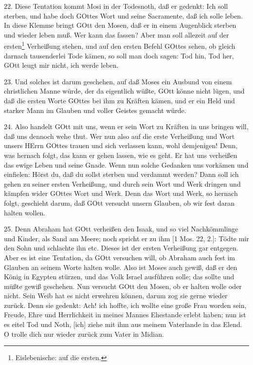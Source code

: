 22. Diese Tentation kommt Mosi in der Todesnoth, daß er gedenkt: Ich soll sterben, und habe doch GOttes Wort und seine Sacramente, daß ich solle leben. In diese Klemme bringt GOtt den Mosen, daß er in einem Augenblick sterben und wieder leben muß. Wer kann das fassen? Aber man soll allezeit auf der ersten\footnote{Eislebenische: auf die ersten.} Verheißung stehen, und auf den ersten Befehl GOttes sehen, ob gleich darnach tausenderlei Tode kämen, so soll man doch sagen: Tod hin, Tod her, GOtt leugt mir nicht, ich werde leben.

23. Und solches ist darum geschehen, auf daß Moses ein Ausbund von einem christlichen Manne würde, der da eigentlich wüßte, GOtt könne nicht lügen, und daß die ersten Worte GOttes bei ihm zu Kräften kämen, und er ein Held und starker Mann im Glauben und voller Geistes gemacht würde.

24. Also handelt GOtt mit uns, wenn er sein Wort zu Kräften in uns bringen will, daß uns dennoch wehe thut. Wer nun also auf die erste Verheißung und Wort unsers HErrn GOttes trauen und sich verlassen kann, wohl demjenigen! Denn, was hernach folgt, das kann er gehen lassen, wie es geht. Er hat uns verheißen das ewige Leben und seine Gnade. Wenn nun solche Gedanken uns vorkämen und einfielen: Hörst du, daß du sollst sterben und verdammt werden? Dann soll ich gehen zu seiner ersten Verheißung, und durch sein Wort und Werk dringen und kämpfen wider GOttes Wort und Werk. Denn das Wort und Werk, so hernach folgt, geschieht darum, daß GOtt versucht unsern Glauben, ob wir fest daran halten wollen.

25. Denn Abraham hat GOtt verheißen den Isaak, und so viel Nachkömmlinge und Kinder,
als Sand am Meere; noch spricht er zu ihm [1 Mos. 22, 2.]: Tödte mir den Sohn und schlachte ihn etc. Dieses ist der ersten Verheißung gar entgegen. Aber es ist eine Tentation, da GOtt versuchen will, ob Abraham auch fest im Glauben an seinem Worte halten wolle. Also ist Moses auch gewiß, daß er den König in Egypten stürzen, und das Volk Israel ausführen solle; das sollte und müßte gewiß geschehen. Nun versucht GOtt den Mosen, ob er halten wolle oder nicht. Sein Weib hat es nicht erwehren können, darum zog sie gerne wieder zurück. Denn sie gedenkt: Ach! ich hoffte, ich wollte eine große Frau worden sein, Freude, Ehre und Herrlichkeit in meines Mannes Ehestande erlebt haben; nun ist es eitel Tod und Noth, [ich] ziehe mit ihm aus meinem Vaterlande in das Elend. O trolle dich nur wieder zurück zum Vater in Midian.

